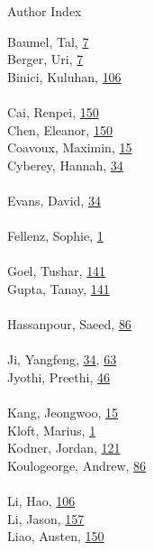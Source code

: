 \documentclass[11pt,oneside]{book}
\begin{document}
\begin{huge}
Author Index
\end{huge}
\vspace*{1em}
\begin{multicols}{2}
Baumel, Tal, \hyperlink{page.7}{7}\\
Berger, Uri, \hyperlink{page.7}{7}\\
Binici, Kuluhan, \hyperlink{page.106}{106}\\
\\ %
Cai, Renpei, \hyperlink{page.150}{150}\\
Chen, Eleanor, \hyperlink{page.150}{150}\\
Coavoux, Maximin, \hyperlink{page.15}{15}\\
Cyberey, Hannah, \hyperlink{page.34}{34}\\
\\ %
Evans, David, \hyperlink{page.34}{34}\\
\\ %
Fellenz, Sophie, \hyperlink{page.1}{1}\\
\\ %
Goel, Tushar, \hyperlink{page.141}{141}\\
Gupta, Tanay, \hyperlink{page.141}{141}\\
\\ %
Hassanpour, Saeed, \hyperlink{page.86}{86}\\
\\ %
Ji, Yangfeng, \hyperlink{page.34}{34}, \hyperlink{page.63}{63}\\
Jyothi, Preethi, \hyperlink{page.46}{46}\\
\\ %
Kang, Jeongwoo, \hyperlink{page.15}{15}\\
Kloft, Marius, \hyperlink{page.1}{1}\\
Kodner, Jordan, \hyperlink{page.121}{121}\\
Koulogeorge, Andrew, \hyperlink{page.86}{86}\\
\\ %
Li, Hao, \hyperlink{page.106}{106}\\
Li, Jason, \hyperlink{page.157}{157}\\
Liao, Austen, \hyperlink{page.150}{150}\\

\end{multicols}
\end{document}
